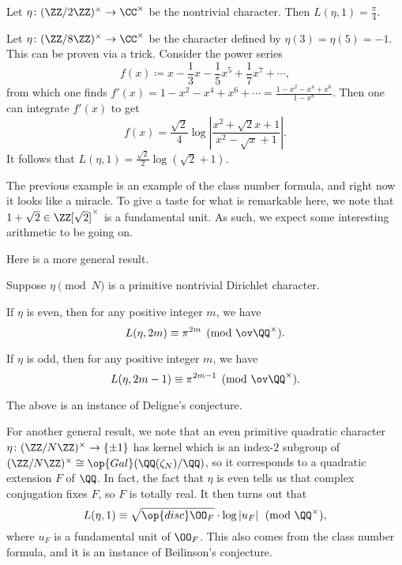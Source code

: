 \documentclass{article}
\begin{document}
\begin{example}
	Let $\eta\colon(\ZZ/2\ZZ)^\times\to\CC^\times$ be the nontrivial character. Then $L(\eta,1)=\frac\pi4$.
\end{example}
\begin{example}
	Let $\eta\colon(\ZZ/8\ZZ)^\times\to\CC^\times$ be the character defined by $\eta(3)=\eta(5)=-1$. This can be proven via a trick. Consider the power series
	\[f(x)\coloneqq x-\frac13x-\frac15x^5+\frac17x^7+\cdots,\]
	from which one finds $f'(x)=1-x^2-x^4+x^6+\cdots=\frac{1-x^2-x^4+x^6}{1-x^8}$. Then one can integrate $f'(x)$ to get
	\[f(x)=\frac{\sqrt2}4\log\left|\frac{x^2+\sqrt 2x+1}{x^2-\sqrt x+1}\right|.\]
	It follows that $L(\eta,1)=\frac{\sqrt2}2\log\left(\sqrt2+1\right)$.
\end{example}
The previous example is an example of the class number formula, and right now it looks like a miracle. To give a taste for what is remarkable here, we note that $1+\sqrt2\in\ZZ[\sqrt2]^\times$ is a fundamental unit. As such, we expect some interesting arithmetic to be going on.

Here is a more general result.
\begin{theorem} \label{thm:baby-quadratic-class-number-formula}
	Suppose $\eta\pmod N$ is a primitive nontrivial Dirichlet character.
	\begin{listalph}
		\item If $\eta$ is even, then for any positive integer $m$, we have
		\[L(\eta,2m)\equiv\pi^{2m}\pmod{\ov\QQ^\times}.\]
		\item If $\eta$ is odd, then for any positive integer $m$, we have
		\[L(\eta,2m-1)\equiv\pi^{2m-1}\pmod{\ov\QQ^\times}.\]
	\end{listalph}
\end{theorem}
The above is an instance of Deligne's conjecture.

For another general result, we note that an even primitive quadratic character $\eta\colon(\ZZ/N\ZZ)^\times\to\{\pm1\}$ has kernel which is an index-$2$ subgroup of $(\ZZ/N\ZZ)^\times\cong\op{Gal}(\QQ(\zeta_N)/\QQ)$, so it corresponds to a quadratic extension $F$ of $\QQ$. In fact, the fact that $\eta$ is even tells us that complex conjugation fixes $F$, so $F$ is totally real. It then turns out that
\[L(\eta,1)\equiv\sqrt{\op{disc}\OO_F}\cdot\log\left|u_F\right|\pmod{\QQ^\times},\]
where $u_F$ is a fundamental unit of $\OO_F$. This also comes from the class number formula, and it is an instance of Beilinson's conjecture.
\end{document}
